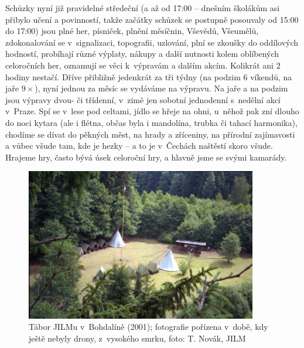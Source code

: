 \documentclass[a5paper, 11pt, twoside]{article}
\begin{document}
Schůzky nyní již pravidelné středeční (a až od 17:00 -- dnešním školákům
asi přibylo učení a povinností, takže začátky schůzek se postupně
posouvaly od 15:00 do 17:00) jsou plné her, písniček, plnění měsíčnin,
Vševědů, Všeumělů, zdokonalování se v~signalizaci, topografii, uzlování,
plní se zkoušky do oddílových hodností, probíhají různé výplaty, nákupy
a další nutnosti kolem oblíbených celoročních her, oznamují se věci
k~výpravám a dalším akcím. Kolikrát ani 2 hodiny nestačí. Dříve přibližně
jedenkrát za tři týdny (na podzim 6 víkendů, na jaře \(9\times\)), nyní jednou za
měsíc se vydáváme na výpravu. Na jaře a na podzim jsou výpravy dvou- či
třídenní, v~zimě jen sobotní jednodenní s~nedělní akcí v~Praze. Spí se
v~lese pod celtami, jídlo se hřeje na ohni, u~něhož pak zní dlouho do noci
kytara (ale i flétna, občas byla i mandolína, trubka či tahací
harmonika), chodíme se dívat do pěkných měst, na hrady a zříceniny, na
přírodní zajímavosti a vůbec všude tam, kde je hezky -- a to je
v~Čechách naštěstí skoro všude. Hrajeme hry, často bývá úsek celoroční
hry, a hlavně jsme se svými kamarády.

\begin{figure}[h]
  \centering 
  \includegraphics[width=0.9\textwidth]{img/80_bohdalin.JPG}
  \caption*{Tábor JILMu v~Bohdalíně (2001); fotografie pořízena v~době, kdy
  ještě nebyly drony, z~vysokého smrku, foto: T. Novák, JILM}
\end{figure}
\end{document}
